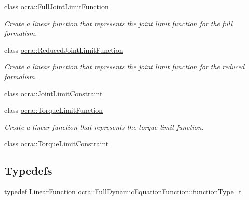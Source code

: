\begin{DoxyCompactItemize}
class \hyperlink{classocra_1_1FullJointLimitFunction}{ocra\+::\+Full\+Joint\+Limit\+Function}
\begin{DoxyCompactList}\small\item\em Create a linear function that represents the joint limit function for the full formalism. \end{DoxyCompactList}\item 
class \hyperlink{classocra_1_1ReducedJointLimitFunction}{ocra\+::\+Reduced\+Joint\+Limit\+Function}
\begin{DoxyCompactList}\small\item\em Create a linear function that represents the joint limit function for the reduced formalism. \end{DoxyCompactList}\item 
class \hyperlink{classocra_1_1JointLimitConstraint}{ocra\+::\+Joint\+Limit\+Constraint}
\item 
class \hyperlink{classocra_1_1TorqueLimitFunction}{ocra\+::\+Torque\+Limit\+Function}
\begin{DoxyCompactList}\small\item\em Create a linear function that represents the torque limit function. \end{DoxyCompactList}\item 
class \hyperlink{classocra_1_1TorqueLimitConstraint}{ocra\+::\+Torque\+Limit\+Constraint}
\end{DoxyCompactItemize}
\subsection*{Typedefs}
\begin{DoxyCompactItemize}
\item 
typedef \hyperlink{classocra_1_1LinearFunction}{Linear\+Function} \hyperlink{group__constraint_ga3f72eb3c4529d2c19ef39928f5e57262}{ocra\+::\+Full\+Dynamic\+Equation\+Function\+::function\+Type\+\_\+t}
\end{DoxyCompactItemize}
